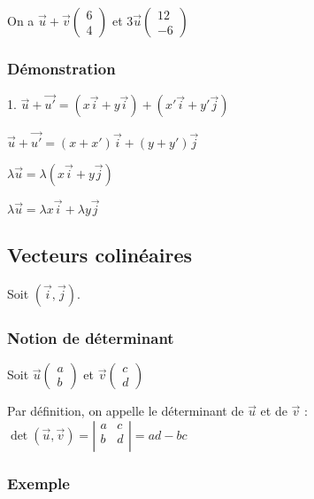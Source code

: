 On a $\vec{u} + \vec{v}\left(\begin{array}{c} 6\\ 4 \end{array}\right)$ et $ 3 \vec{u}\left(\begin{array}{c} 12\\ -6 \end{array}\right)$
\newpage
\subsubsection{Démonstration} 

1. $\vec{u} + \overrightarrow{u'} = \left(x\vec{i} + y\vec{i}\right) + \left(x'\vec{i} + y'\vec{j}\right) $

$ \vec{u} + \overrightarrow{u'} = \left(x+x'\right) \vec{i} + \left(y + y'\right)\vec{j} $

$\lambda \vec{u} = \lambda \left(x\vec{i} + y\vec{j}\right)$

$\lambda \vec{u} = \lambda x\vec{i} + \lambda y\vec{j} $

\subsection{Vecteurs colinéaires}

Soit $\left(\vec{i}, \vec{j}\right)$.

\subsubsection{Notion de déterminant}

Soit $\vec{u}\left(\begin{array}{c} a\\ b \end{array}\right)$ et $\vec{v}\left(\begin{array}{c} c\\ d \end{array}\right)$

Par définition, on appelle le déterminant de $\vec{u}$ et de $\vec{v}$ : $\det\left(\vec{u}, \vec{v}\right) = \left| \begin{array}{cc}  a & c \\ b & d  \\ \end{array} \right| = ad- bc $

\subsubsection{Exemple }

